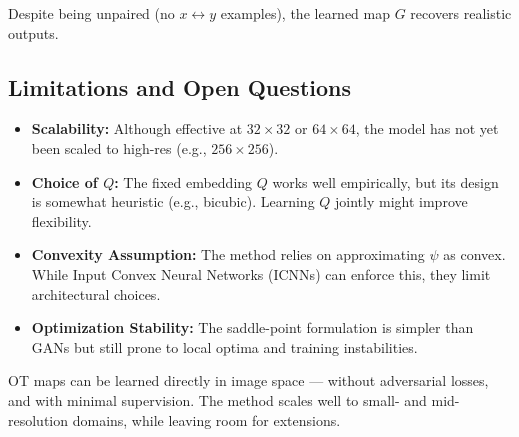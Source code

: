 \documentclass[11pt]{article}
\begin{document}
Despite being unpaired (no $x \leftrightarrow y$ examples), the learned map $G$ recovers realistic outputs.

\subsection*{Limitations and Open Questions}

\begin{itemize}
  \item \textbf{Scalability:} Although effective at $32\times32$ or $64\times64$, the model has not yet been scaled to high-res (e.g., $256\times256$).
  \item \textbf{Choice of $Q$:} The fixed embedding $Q$ works well empirically, but its design is somewhat heuristic (e.g., bicubic). Learning $Q$ jointly might improve flexibility.
  \item \textbf{Convexity Assumption:} The method relies on approximating $\psi$ as convex. While Input Convex Neural Networks (ICNNs) can enforce this, they limit architectural choices.
  \item \textbf{Optimization Stability:} The saddle-point formulation is simpler than GANs but still prone to local optima and training instabilities.
\end{itemize}

\begin{tcolorbox}[colback=blue!5!white, colframe=blue!80!black, title=Key Insight]
OT maps can be learned directly in image space — without adversarial losses, and with minimal supervision. 
The method scales well to small- and mid-resolution domains, while leaving room for extensions.
\end{tcolorbox}
\end{document}

